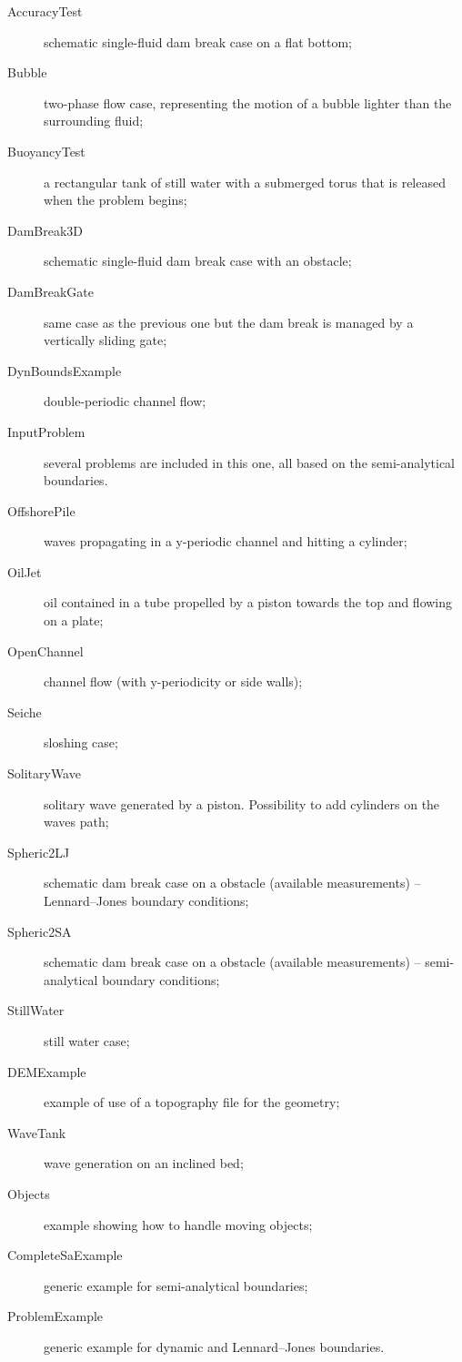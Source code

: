 \documentclass{../GPUSPHtemplate}
\begin{document}
\begin{description}
\item[AccuracyTest]
schematic single-fluid dam break case on a flat bottom;
\item[Bubble]
two-phase flow case, representing the motion of a bubble lighter
than the surrounding fluid;
\item[BuoyancyTest]
a rectangular tank of still water with a submerged torus 
that is released when the problem begins;
\item[DamBreak3D]
schematic single-fluid dam break case with an obstacle;
\item[DamBreakGate]
same case as the previous one but the dam break is managed by a
vertically sliding gate;
\item[DynBoundsExample]
double-periodic channel flow;
\item[InputProblem]
several problems are included in this one, all based on the semi-analytical boundaries.
\item[OffshorePile]
waves propagating in a y-periodic channel and hitting a cylinder;
\item[OilJet]
oil contained in a tube propelled by a piston towards the top and flowing on a plate;
\item[OpenChannel]
channel flow (with y-periodicity or side walls);
\item[Seiche]
sloshing case;
\item[SolitaryWave]
solitary wave generated by a piston. Possibility to add cylinders on the waves path;
\item[Spheric2LJ]
schematic dam break case on a obstacle (available measurements) -- Lennard--Jones boundary conditions;
\item[Spheric2SA]
schematic dam break case on a obstacle (available measurements) -- semi-analytical boundary conditions;
\item[StillWater]
still water case;
\item[DEMExample]
example of use of a topography file for the geometry;
\item[WaveTank]
wave generation on an inclined bed;
\item[Objects]
example showing how to handle moving objects;
\item[CompleteSaExample]
generic example for semi-analytical boundaries;
\item[ProblemExample]
generic example for dynamic and Lennard--Jones boundaries.
\end{description}
\end{document}
